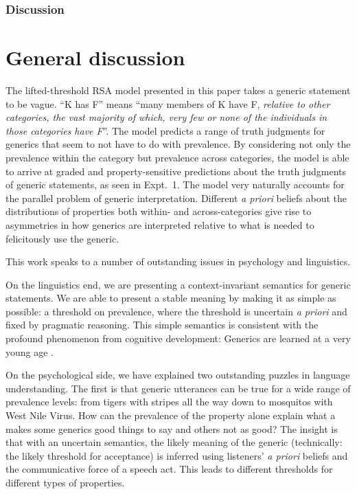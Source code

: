 \documentclass[10pt,letterpaper]{article}
\begin{document}
\subsubsection{Discussion}



\section{General discussion}

The lifted-threshold RSA model presented in this paper takes a generic statement to be vague. ``K has F'' means ``many members of K have F, \emph{relative to other categories, the vast majority of which, very few or none of the individuals in those categories have F}''. 
The model predicts a range of truth judgments for generics that seem to not have to do with prevalence. 
By considering not only the prevalence within the category but prevalence across categories, the model is able to arrive at graded and property-sensitive predictions about the truth judgments of generic statements, as seen in Expt.~1. 
The model very naturally accounts for the parallel problem of generic interpretation. 
Different \emph{a priori} beliefs about the distributions of properties both within- and across-categories give rise to asymmetries in how generics are interpreted relative to what is needed to felicitously use the generic. 

This work speaks to a number of outstanding issues in psychology and linguistics. 

On the linguistics end, we are presenting a context-invariant semantics for generic statements. 
We are able to present a stable meaning by making it as simple as possible: a threshold on prevalence, where the threshold is uncertain \emph{a priori} and fixed by pragmatic reasoning.
This simple semantics is consistent with the profound phenomenon from cognitive development: Generics are learned at a very young age \cite{Gelman1998, Gelman2004, Gelman2008, Cimpian2008}.

On the psychological side, we have explained two outstanding puzzles in language understanding. 
The first is that generic utterances can be true for a wide range of prevalence levels: from tigers with stripes all the way down to mosquitos with West Nile Virus. 
How can the prevalence of the property alone explain what a makes some generics good things to say and others not as good? 
The insight is that with an uncertain semantics, the likely meaning of the generic (technically: the likely threshold for acceptance) is inferred using listeners' \emph{a priori} beliefs and the communicative force of a speech act. 
This leads to different thresholds for different types of properties. 
\end{document}
